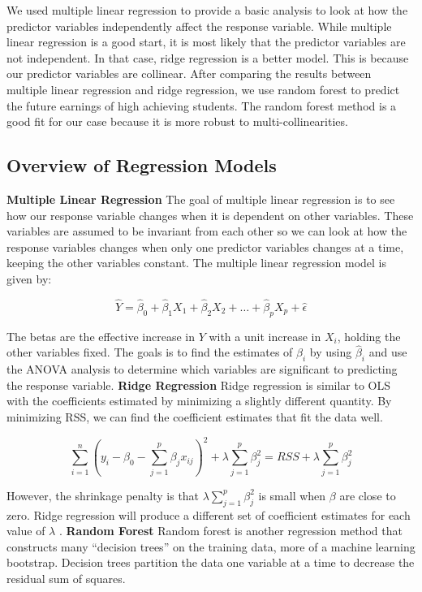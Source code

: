 \documentclass{article}
\begin{document}
  We used multiple linear regression to provide a basic analysis to look at how the predictor variables independently affect the response variable.  
While multiple linear regression is a good start, it is most likely that the predictor variables are not independent.  In that case, ridge regression is a better model.  This is because our predictor variables are collinear.  
After comparing the results between multiple linear regression and ridge regression, we use random forest to predict the future earnings of high achieving students.  The random forest method is a good fit for our case because it is more robust to multi-collinearities. 


\subsection{Overview of Regression Models}

\textbf{Multiple Linear Regression} \newline
The goal of multiple linear regression is to see how our response variable changes when it is dependent on other variables.  These variables are assumed to be invariant from each other so we can look at how the response variables changes when only one predictor variables changes at a time, keeping the other variables constant.  The multiple linear regression model is given by:

$$\hat Y = \hat \beta_0 + \hat \beta_1 X_1 + \hat \beta_2 X_2 + \dots + \hat \beta_p X_p + \hat \epsilon$$

The betas are the effective increase in $Y$ with a unit increase in $X_i$, holding the other variables fixed.  
The goals is to find the estimates of $\beta_i$ by using $\hat \beta_i$ and use the ANOVA analysis to determine which variables are significant to predicting the response variable.
\newline
\newline
\textbf{Ridge Regression}\newline
Ridge regression is similar to OLS with the coefficients estimated by minimizing a slightly different quantity.  By minimizing RSS, we can find the coefficient estimates that fit the data well. 

$$\sum_{i=1}^{n}(y_i-\beta_0-\sum_{j=1}^{p}\beta_jx_{ij})^2+\lambda\sum_{j=1}^{p}\beta_j^2 = RSS + \lambda\sum_{j=1}^{p}\beta_j^{2}$$ 

However, the shrinkage penalty is that $\lambda\sum_{j=1}^{p}\beta_j^{2}$ is small when $\beta$ are close to zero. Ridge regression will produce a different set of coefficient estimates for each value of $\lambda$ .
\newline
\newline
\textbf{Random Forest}\newline
Random forest is another regression method that constructs many ``decision trees'' on the training data, more of a machine learning bootstrap.  Decision trees partition the data one variable at a time to decrease the residual sum of squares. 
\end{document}
